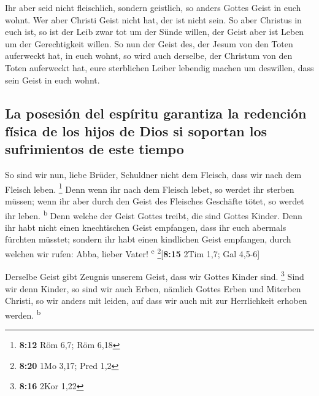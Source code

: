  Ihr aber seid nicht fleischlich, sondern geistlich, so
anders Gottes Geist in euch wohnt. Wer aber Christi Geist nicht hat, der
ist nicht sein.  So aber Christus in euch ist, so ist der
Leib zwar tot um der Sünde willen, der Geist aber ist Leben um der
Gerechtigkeit willen.  So nun der Geist des, der Jesum
von den Toten auferweckt hat, in euch wohnt, so wird auch derselbe, der
Christum von den Toten auferweckt hat, eure sterblichen Leiber lebendig
machen um deswillen, dass sein Geist in euch wohnt.

\hypertarget{la-posesiuxf3n-del-espuxedritu-garantiza-la-redenciuxf3n-fuxedsica-de-los-hijos-de-dios-si-soportan-los-sufrimientos-de-este-tiempo}{%
\subsection{La posesión del espíritu garantiza la redención física de
los hijos de Dios si soportan los sufrimientos de este
tiempo}\label{la-posesiuxf3n-del-espuxedritu-garantiza-la-redenciuxf3n-fuxedsica-de-los-hijos-de-dios-si-soportan-los-sufrimientos-de-este-tiempo}}

 So sind wir nun, liebe Brüder, Schuldner nicht dem
Fleisch, dass wir nach dem Fleisch leben. \footnote{\textbf{8:12} Röm
  6,7; Röm 6,18}  Denn wenn ihr nach dem Fleisch lebet,
so werdet ihr sterben müssen; wenn ihr aber durch den Geist des
Fleisches Geschäfte tötet, so werdet ihr leben. \textsuperscript{b}
 Denn welche der Geist Gottes treibt, die sind Gottes
Kinder.  Denn ihr habt nicht einen knechtischen Geist
empfangen, dass ihr euch abermals fürchten müsstet; sondern ihr habt
einen kindlichen Geist empfangen, durch welchen wir rufen: Abba, lieber
Vater! \textsuperscript{c} \footnote{\textbf{8:20} 1Mo 3,17; Pred 1,2}{[}\textbf{8:15}
2Tim 1,7; Gal 4,5-6{]}

 Derselbe Geist gibt Zeugnis unserem Geist, dass wir
Gottes Kinder sind. \footnote{\textbf{8:16} 2Kor 1,22} 
Sind wir denn Kinder, so sind wir auch Erben, nämlich Gottes Erben und
Miterben Christi, so wir anders mit leiden, auf dass wir auch mit zur
Herrlichkeit erhoben werden. \textsuperscript{b}

